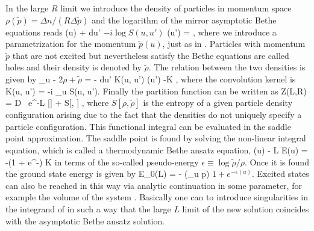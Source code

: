 In the large $R$ limit we introduce the density of particles in momentum space $\rho(\tilde{p}) = \Delta n / (R \Delta \tilde p)$ and the logarithm of the mirror asymptotic Bethe equations reads
\beq
	(u) + \int du' \( -i \log S(u, u') \) \rho(u') = ,
\eeq
where we introduce a parametrization for the momentum $\tilde{p}(u)$, just as in . 
Particles with momentum $\tilde{p}$ that are not excited but nevertheless satisfy the Bethe equations are called holes and their density is denoted by $\tilde{\rho}$.
The relation between the two densities is given by
\beq
	\partial_u  - 2\pi \( \rho + \tilde \rho \) = - \int du' K(u, u') \rho(u') \equiv -K \star \rho,
\eeq
where the convolution kernel is
\beq
	K(u, u') = -i \partial_u \log S(u, u').
\eeq
Finally the partition function can be written as
\beq
	Z(L,R) = \int \mathcal D \rho \, e^{-L [\rho] + S[\rho, \tilde{\rho}] },
\eeq
where $S[\rho, \tilde{\rho}]$ is the entropy of a given particle density configuration arising due to the fact that the densities do not uniquely specify a particle configuration.
This functional integral can be evaluated in the saddle point approximation. 
The saddle point is found by solving the non-linear integral equation, which is called a thermodynamic Bethe ansatz equation,
\beq
	\label{eq:simple_tba}
	\epsilon(u) - L \tilde E(u) = -\log (1 + e^{-\epsilon}) \star K
\eeq
in terms of the so-called pseudo-energy $\epsilon \equiv \log \tilde{\rho} / \rho$. 
Once it is found the ground state energy is given by
\beq
	E_0(L) = - \int {} (\partial_u \tilde p) \log \(1 + e^{-\epsilon(u)}\).
\eeq
Excited states can also be reached in this way via analytic continuation in some parameter, for example the volume of the system \cite{Dorey:1996re}.
Basically one can to introduce singularities in the integrand of  in such a way that the large $L$ limit of the new solution coincides with the asymptotic Bethe ansatz solution.

